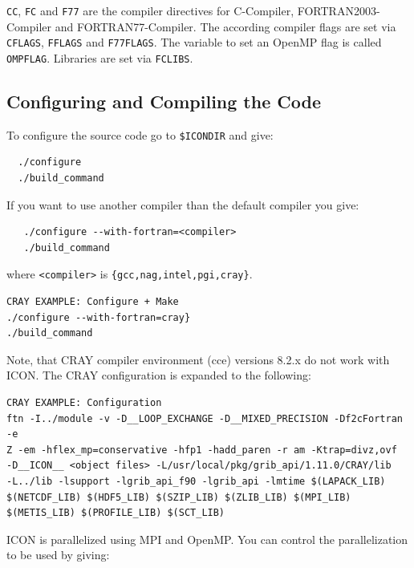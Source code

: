 \verb+CC+, \verb+FC+ and \verb+F77+ are the compiler directives for C-Compiler, FORTRAN2003-Compiler and FORTRAN77-Compiler. The according compiler flags are set via \verb+CFLAGS+, \verb+FFLAGS+ and \verb+F77FLAGS+. The variable to set an OpenMP flag is called \verb+OMPFLAG+. Libraries are set via \verb+FCLIBS+. 

\subsection{Configuring and Compiling the Code} \label{sec:config_compile}

To configure the source code go to \verb+$ICONDIR+ and give:

\begin{small}
 \begin{verbatim}
  ./configure
  ./build_command
  \end{verbatim}
\end{small}

If you want to use another compiler than the default compiler you give:

\begin{small}
  \begin{verbatim}
   ./configure --with-fortran=<compiler>
   ./build_command
  \end{verbatim}
\end{small}

where \verb+<compiler>+ is \verb+{gcc,nag,intel,pgi,cray}+.

\begin{Verbatim}[frame=single]
CRAY EXAMPLE: Configure + Make
./configure --with-fortran=cray}
./build_command
\end{Verbatim}

Note, that CRAY compiler environment (cce) versions 8.2.x do not work with ICON. The CRAY configuration is expanded to the following:

\begin{Verbatim}[frame=single]
CRAY EXAMPLE: Configuration
ftn -I../module -v -D__LOOP_EXCHANGE -D__MIXED_PRECISION -Df2cFortran -e 
Z -em -hflex_mp=conservative -hfp1 -hadd_paren -r am -Ktrap=divz,ovf 
-D__ICON__ <object files> -L/usr/local/pkg/grib_api/1.11.0/CRAY/lib  
-L../lib -lsupport -lgrib_api_f90 -lgrib_api -lmtime $(LAPACK_LIB) 
$(NETCDF_LIB) $(HDF5_LIB) $(SZIP_LIB) $(ZLIB_LIB) $(MPI_LIB) 
$(METIS_LIB) $(PROFILE_LIB) $(SCT_LIB)
\end{Verbatim}

ICON is parallelized using MPI and OpenMP. You can control the parallelization to be used by giving:

